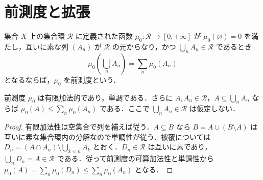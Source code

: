 \section{前測度と拡張}
\begin{defn}[前測度]
集合 $X$ 上の集合環 $\mathcal R$ に定義された函数 $\mu_0:\mathcal R\to[0,+\infty]$ が $\mu_0(\varnothing)=0$ を満たし，互いに素な列 $(A_n)$ が $\mathcal R$ の元からなり，かつ $\bigcup_n A_n\in\mathcal R$ であるとき
\[
 \mu_0\left(\bigcup_n A_n\right)=\sum_n\mu_0(A_n)
\]
となるならば，$\mu_0$ を前測度という．
\end{defn}
\begin{prop}[前測度の単調性と被覆不等式]
前測度 $\mu_0$ は有限加法的であり，単調である．さらに $A,A_n\in\mathcal R$，$A\subseteq\bigcup_n A_n$ ならば $\mu_0(A)\leq\sum_n\mu_0(A_n)$ である．ここで $\bigcup_n A_n\in\mathcal R$ は仮定しない．
\end{prop}
\begin{proof}
有限加法性は空集合で列を補えば従う．$A\subseteq B$ なら $B=A\cup(B\setminus A)$ は互いに素な集合環内の分解なので単調性が従う．被覆については $D_n=(A\cap A_n)\setminus\bigcup_{k<n}A_k$ とおく．$D_n\in\mathcal R$ は互いに素であり，$\bigcup_n D_n=A\in\mathcal R$ である．従って前測度の可算加法性と単調性から $\mu_0(A)=\sum_n\mu_0(D_n)\leq\sum_n\mu_0(A_n)$ となる．
\end{proof}
